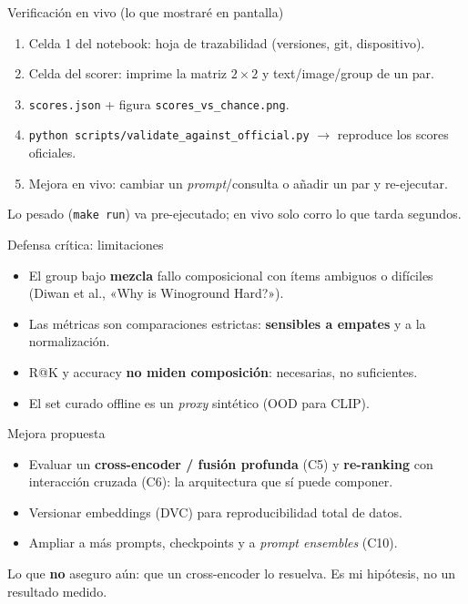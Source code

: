 \documentclass[aspectratio=169]{beamer}
\begin{document}
\begin{frame}{Verificación en vivo (lo que mostraré en pantalla)}
  \footnotesize
  \begin{enumerate}
    \item Celda 1 del notebook: hoja de trazabilidad (versiones, git, dispositivo).
    \item Celda del scorer: imprime la matriz $2\times2$ y text/image/group de un par.
    \item \texttt{scores.json} + figura \texttt{scores\_vs\_chance.png}.
    \item \texttt{python scripts/validate\_against\_official.py} $\to$ reproduce los scores oficiales.
    \item Mejora en vivo: cambiar un \emph{prompt}/consulta o añadir un par y re-ejecutar.
  \end{enumerate}
  \vfill
  \footnotesize\centering Lo pesado (\texttt{make run}) va pre-ejecutado; en vivo solo corro lo que tarda segundos.
\end{frame}

\begin{frame}{Defensa crítica: limitaciones}
  \begin{itemize}
    \item El group bajo \textbf{mezcla} fallo composicional con ítems ambiguos o difíciles
    (Diwan et al., «Why is Winoground Hard?»).
    \item Las métricas son comparaciones estrictas: \textbf{sensibles a empates} y a la normalización.
    \item R@K y accuracy \textbf{no miden composición}: necesarias, no suficientes.
    \item El set curado offline es un \emph{proxy} sintético (OOD para CLIP).
  \end{itemize}
\end{frame}

\begin{frame}{Mejora propuesta}
  \begin{itemize}
    \item Evaluar un \textbf{cross-encoder / fusión profunda} (C5) y \textbf{re-ranking} con
    interacción cruzada (C6): la arquitectura que sí puede componer.
    \item Versionar embeddings (DVC) para reproducibilidad total de datos.
    \item Ampliar a más prompts, checkpoints y a \emph{prompt ensembles} (C10).
  \end{itemize}
  \vfill
  \centering\footnotesize Lo que \textbf{no} aseguro aún: que un cross-encoder lo resuelva. Es mi hipótesis, no un resultado medido.
\end{frame}
\end{document}
